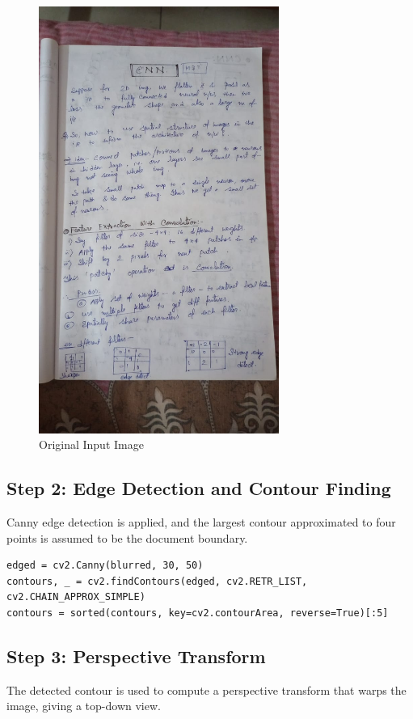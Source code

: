 \documentclass[12pt]{article}
\begin{document}
\begin{figure}[H]
    \centering
    \includegraphics[width=0.7\textwidth]{doc.jpg}
    \caption{Original Input Image}
\end{figure}

\subsection{Step 2: Edge Detection and Contour Finding}
Canny edge detection is applied, and the largest contour approximated to four points is assumed to be the document boundary.

\begin{verbatim}
edged = cv2.Canny(blurred, 30, 50)
contours, _ = cv2.findContours(edged, cv2.RETR_LIST, cv2.CHAIN_APPROX_SIMPLE)
contours = sorted(contours, key=cv2.contourArea, reverse=True)[:5]
\end{verbatim}



\subsection{Step 3: Perspective Transform}
The detected contour is used to compute a perspective transform that warps the image, giving a top-down view.
\end{document}
